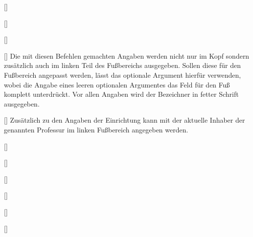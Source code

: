 \begin{Bundle*}[v2.05]{}
\begin{Declaration}{%
  []%
}
\begin{Declaration}{%
  []%
}
\begin{Declaration}{%
  []%
}
\begin{Declaration}{%
  []%
}
\printdeclarationlist%
%
Die mit diesen Befehlen gemachten Angaben werden nicht nur im Kopf sondern 
zusätzlich auch im linken Teil des Fußbereichs ausgegeben. Sollen diese für den 
Fußbereich angepasst werden, lässt das optionale Argument hierfür verwenden, 
wobei die Angabe eines leeren optionalen Argumentes das Feld für den Fuß 
komplett unterdrückt. Vor allen Angaben wird der Bezeichner  
in fetter Schrift ausgegeben.
\end{Declaration}
\end{Declaration}
\end{Declaration}
\end{Declaration}


\begin{Declaration}{[]}
\printdeclarationlist%
%
Zusätzlich zu den Angaben der Einrichtung kann mit  der 
aktuelle Inhaber der genannten Professur im linken Fußbereich angegeben werden.
\end{Declaration}

\begin{Declaration}{[]}
\begin{Declaration}{[]}
\begin{Declaration}{[]}
\begin{Declaration}{[]}
\begin{Declaration}{[]}
\begin{Declaration}{[]}


\end{Declaration}
\end{Declaration}
\end{Declaration}
\end{Declaration}
\end{Declaration}
\end{Declaration}
\end{Bundle*}
